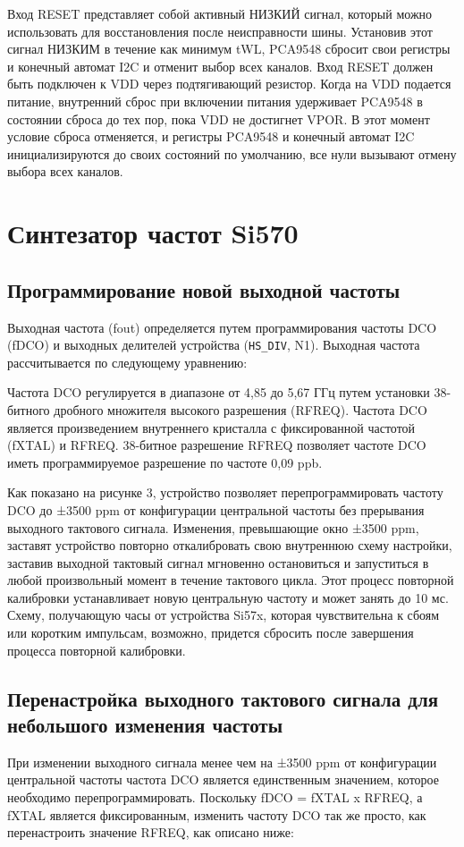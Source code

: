 \documentclass[a4paper,oneside ,10pt]{extreport}
\begin{document}
Вход RESET представляет собой активный НИЗКИЙ сигнал, который можно использовать для восстановления после неисправности шины. Установив этот сигнал НИЗКИМ в течение как минимум tWL, PCA9548 сбросит свои регистры и конечный автомат I2C и отменит выбор всех каналов. Вход RESET должен быть подключен к VDD через подтягивающий резистор.
Когда на VDD подается питание, внутренний сброс при включении питания удерживает PCA9548 в состоянии сброса до тех пор, пока VDD не достигнет VPOR. В этот момент условие сброса отменяется, и регистры PCA9548 и конечный автомат I2C инициализируются до своих состояний по умолчанию, все нули вызывают отмену выбора всех каналов.

\section{Синтезатор частот Si570}

\subsection{Программирование новой выходной частоты}

Выходная частота (fout) определяется путем программирования частоты DCO (fDCO) и выходных делителей устройства (\verb|HS_DIV|, N1). Выходная частота рассчитывается по следующему уравнению:

Частота DCO регулируется в диапазоне от 4,85 до 5,67 ГГц путем установки 38-битного дробного множителя высокого разрешения (RFREQ). Частота DCO является произведением внутреннего кристалла с фиксированной частотой (fXTAL) и RFREQ. 38-битное разрешение RFREQ позволяет частоте DCO иметь программируемое разрешение по частоте 0,09 ppb.

Как показано на рисунке 3, устройство позволяет перепрограммировать частоту DCO до ±3500 ppm от конфигурации центральной частоты без прерывания выходного тактового сигнала. Изменения, превышающие окно ±3500 ppm, заставят устройство повторно откалибровать свою внутреннюю схему настройки, заставив выходной тактовый сигнал мгновенно остановиться и запуститься в любой произвольный момент в течение тактового цикла. Этот процесс повторной калибровки устанавливает новую центральную частоту и может занять до 10 мс. Схему, получающую часы от устройства Si57x, которая чувствительна к сбоям или коротким импульсам, возможно, придется сбросить после завершения процесса повторной калибровки.

\subsection{Перенастройка выходного тактового сигнала для небольшого изменения частоты}
При изменении выходного сигнала менее чем на ±3500 ppm от конфигурации центральной частоты частота DCO является единственным значением, которое необходимо перепрограммировать. Поскольку fDCO = fXTAL x RFREQ, а fXTAL является фиксированным, изменить частоту DCO так же просто, как перенастроить значение RFREQ, как описано ниже:
\end{document}
